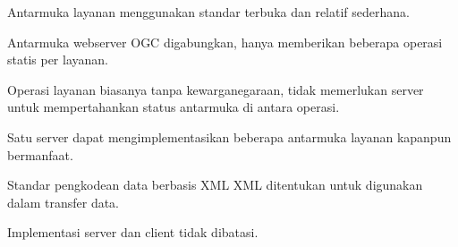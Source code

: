 \item Antarmuka layanan menggunakan standar terbuka dan relatif sederhana.
\begin{numerize}
\item Antarmuka webserver OGC digabungkan, hanya memberikan beberapa operasi statis per layanan.
\item Operasi layanan biasanya tanpa kewarganegaraan, tidak memerlukan server untuk mempertahankan status antarmuka di antara operasi.
\item Satu server dapat mengimplementasikan beberapa antarmuka layanan kapanpun bermanfaat.
\item Standar pengkodean data berbasis XML XML ditentukan untuk digunakan dalam transfer data.
\end{numerize}
\item Implementasi server dan client tidak dibatasi.
